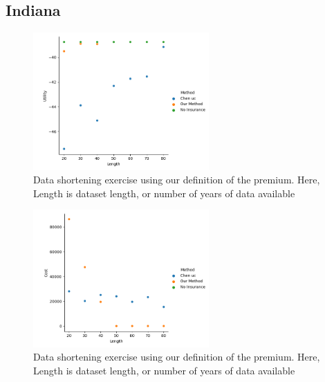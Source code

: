 \documentclass[11pt]{article}
\begin{document}
    \subsection{Indiana}
    \begin{figure}[h]
        \centering
        \includegraphics[width=0.6\textwidth]{../../../output/figures/Evaluation/Indiana_Utility_Length_ml1.png}
        \caption{Data shortening exercise using our definition of the premium. Here, Length is dataset length, or number of years of data available}
        \end{figure}
        \FloatBarrier

        \begin{figure}[h]
        \centering
        \includegraphics[width=0.6\textwidth]{../../../output/figures/Evaluation/Indiana_Cost_Length_ml1.png}
        \caption{Data shortening exercise using our definition of the premium. Here, Length is dataset length, or number of years of data available}
        \end{figure}
        \FloatBarrier
\end{document}

